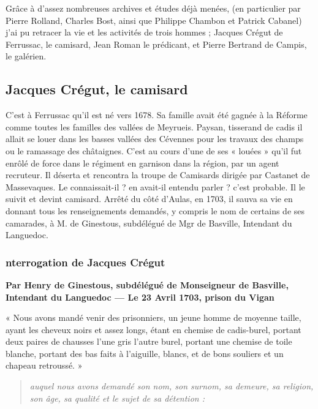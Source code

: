 %




Grâce à d’assez nombreuses archives et études déjà menées, (en particulier par Pierre Rolland, Charles Bost, ainsi que Philippe Chambon et Patrick Cabanel) j’ai pu retracer la vie et les activités de trois hommes ; Jacques Crégut de Ferrussac, le camisard, Jean Roman le prédicant, et Pierre Bertrand de Campis, le galérien.


\subsection{Jacques Crégut, le camisard}

C’est à Ferrussac qu’il est né vers 1678. Sa famille avait été gagnée à la Réforme comme toutes les familles des vallées de Meyrueis. Paysan, tisserand de cadis il allait se louer dans les basses vallées des Cévennes pour les travaux des champs ou le ramassage des châtaignes. C’est au cours d’une de ses « louées » qu’il fut enrôlé de force dans le régiment en garnison dans la région, par un agent recruteur. Il déserta et rencontra la troupe de Camisards dirigée par Castanet de Massevaques. Le connaissait-il ? en avait-il entendu parler ? c’est probable. Il le suivit et devint camisard. Arrêté du côté d’Aulas, en 1703, il sauva sa vie en donnant tous les renseignements demandés, y compris le nom de certains de ses camarades, à M. de Ginestous, subdélégué de Mgr de Basville, Intendant du Languedoc.

\subsubsection{nterrogation de Jacques Crégut}

\textbf{Par Henry de Ginestous, subdélégué de Monseigneur de Basville, Intendant du Languedoc --- Le 23 Avril 1703, prison du Vigan}


« Nous avons mandé venir des prisonniers, un jeune homme de moyenne taille, ayant les cheveux noirs et assez longs, étant en chemise de cadis-burel, portant deux paires de chausses l’une gris l’autre burel, portant une chemise de toile blanche, portant des bas faits à l’aiguille, blancs, et de bons souliers et un chapeau retroussé. »

\begin{quote}
\itshape
auquel nous avons demandé son nom, son surnom, sa demeure, sa religion, son âge, sa qualité et le sujet de sa détention :
\end{quote}

